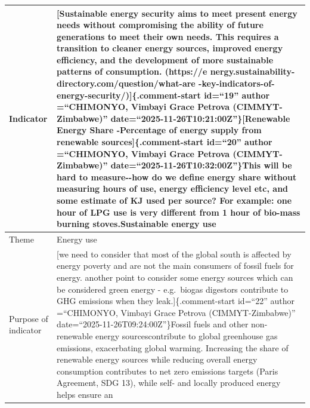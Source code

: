 \documentclass[
  letterpaper,
  DIV=11,
  numbers=noendperiod]{scrreprt}
\begin{document}
\begin{longtable}[]{@{}
  >{\raggedright\arraybackslash}p{}
  >{\raggedright\arraybackslash}p{}@{}}
\toprule\noalign{}
\begin{minipage}[b]{\linewidth}\raggedright
\textbf{Indicator}
\end{minipage} & \begin{minipage}[b]{\linewidth}\raggedright
{[}Sustainable energy security aims to meet present energy needs without
compromising the ability of future generations to meet their own needs.
This requires a transition to cleaner energy sources, improved energy
efficiency, and the development of more sustainable patterns of
consumption. (https://e
nergy.sustainability-directory.com/question/what-are
-key-indicators-of-energy-security/){]}\{.comment-start id=``19'' author
=``CHIMONYO, Vimbayi Grace Petrova (CIMMYT-Zimbabwe)''
date=``2025-11-26T10:21:00Z''\}{[}Renewable Energy Share -Percentage of
energy supply from renewable sources{]}\{.comment-start id=``20'' author
=``CHIMONYO, Vimbayi Grace Petrova (CIMMYT-Zimbabwe)''
date=``2025-11-26T10:32:00Z''\}\label{21}{This will be
hard to measure-\/-how do we define energy share without measuring hours
of use, energy efficiency level etc, and some estimate of KJ used per
source? For example: one hour of LPG use is very different from 1 hour
of bio-mass burning stoves.}\textbf{Sustainable energy
use}\label{19}{\label{20}{\label{21}{}}}
\end{minipage} \\
\midrule\noalign{}
\endhead
\bottomrule\noalign{}
\endlastfoot
Theme & Energy use \\
Purpose of indicator & {[}we need to consider that most of the global
south is affected by energy poverty and are not the main consumers of
fossil fuels for energy. another point to consider some energy sources
which can be considered green energy - e.g.~biogas digestors contribute
to GHG emissions when they leak.{]}\{.comment-start id=``22'' author
=``CHIMONYO, Vimbayi Grace Petrova (CIMMYT-Zimbabwe)''
date=``2025-11-26T09:24:00Z''\}Fossil fuels and other non-renewable
energy sources\label{22}{} contribute to global
greenhouse gas emissions, exacerbating global warming. Increasing the
share of renewable energy sources while reducing overall energy
consumption contributes to net zero emissions targets (Paris Agreement,
SDG 13), while self- and locally produced energy helps ensure an

\end{longtable}
\end{document}
